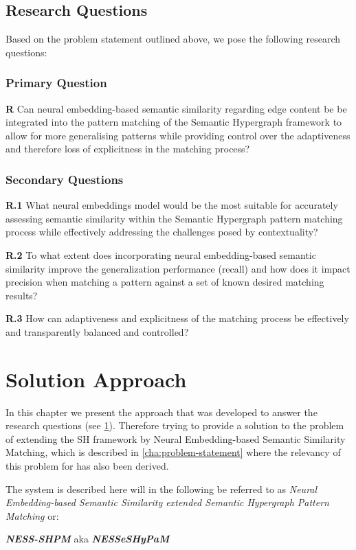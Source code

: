 \documentclass[11pt]{scrreprt}
\begin{document}
\section{Research Questions}
\label{sec:research-questions}
Based on the problem statement outlined above, we pose the following research questions:

\subsection{Primary Question}
\textbf{R} Can neural embedding-based semantic similarity regarding edge content be be integrated into the pattern matching of the Semantic Hypergraph framework to allow for more generalising patterns while providing control over the adaptiveness and therefore loss of explicitness in the matching process?

\subsection{Secondary Questions}
\textbf{R.1} What neural embeddings model would be the most suitable for accurately assessing semantic similarity within the Semantic Hypergraph pattern matching process while effectively addressing the challenges posed by contextuality?

\textbf{R.2} To what extent does incorporating neural embedding-based semantic similarity improve the generalization performance (recall) and how does it impact precision when matching a pattern against a set of known desired matching results?

\textbf{R.3} How can adaptiveness and explicitness of the matching process be effectively and transparently balanced and controlled?


\chapter{Solution Approach}
\label{cha:solution-approach}
In this chapter we present the approach that was developed to answer the research questions (see \cref{sec:research-questions}). Therefore trying to provide a solution to the problem of extending the SH framework by Neural Embedding-based Semantic Similarity Matching, which is described in \cref{cha:problem-statement} where the relevancy of this problem for has also been derived.

The system is described here will in the following be referred to as \textit{Neural Embedding-based Semantic Similarity extended Semantic Hypergraph Pattern Matching} or:
\begin{center}
\textit{\textbf{NESS-SHPM}} aka \textit{\textbf{NESSeSHyPaM}}	
\end{center}
\end{document}
